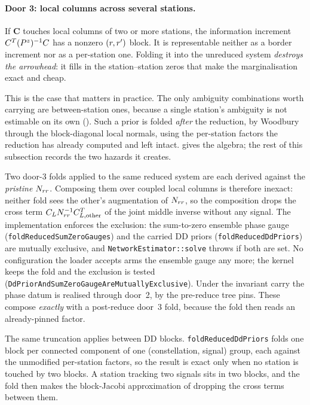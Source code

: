 \documentclass[main.tex]{subfiles}
\begin{document}
\paragraph{Door 3: local columns across several stations.}
If $\bm{C}$ touches local columns of two or more stations, the
information increment $C^{T}(P^{z})^{-1}C$ has a nonzero
$(r,r')$ block.  It is representable neither as a border increment
nor as a per-station one.  Folding it into the unreduced system
\emph{destroys the arrowhead}: it fills in the station--station zeros
that make the marginalisation exact and cheap.

This is the case that matters in practice.  The only ambiguity
combinations worth carrying are between-station ones, because a single
station's ambiguity is not estimable on its own
().  Such a prior is folded \emph{after} the reduction, by
Woodbury through the block-diagonal local normals, using the
per-station factors the reduction has already computed and left
intact.   gives the algebra; the rest of this
subsection records the two hazards it creates.

\begin{remark}
Two door-3 folds applied to the same reduced system are each derived
against the \emph{pristine} $N_{rr}$.  Composing them over coupled local
columns is therefore inexact: neither fold sees the other's
augmentation of $N_{rr}$, so the composition drops the cross term
$C_LN_{rr}^{-1}C_{L,\text{other}}^{T}$ of the joint middle
inverse without any signal.  The implementation enforces the exclusion:
the sum-to-zero ensemble phase gauge (\texttt{foldReducedSumZeroGauges})
and the carried DD priors (\texttt{foldReducedDdPriors}) are mutually
exclusive, and \texttt{NetworkEstimator::solve} throws if both are set.
No configuration the loader accepts arms the ensemble gauge any more;
the kernel keeps the fold and the exclusion is tested
(\texttt{DdPriorAndSumZeroGaugeAreMutuallyExclusive}).  Under the
invariant carry the phase datum is realised through door~2, by the
pre-reduce tree pins.  These compose \emph{exactly} with a
post-reduce door~3 fold, because the fold then reads an already-pinned
factor.

The same truncation applies between DD blocks.
\texttt{foldReducedDdPriors} folds one block per connected component of
one (constellation, signal) group, each against the unmodified
per-station factors, so the result is exact only when no station is touched by two blocks.  A
station tracking two signals sits in two blocks, and the fold then
makes the block-Jacobi approximation of dropping the cross terms between
them.
\end{remark}
\end{document}
